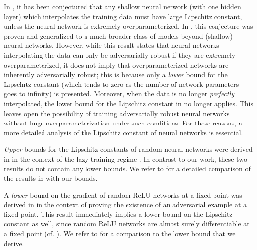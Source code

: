 In \cite{bubeck2021law}, it has been conjectured that any shallow neural network
(with one hidden layer)  which interpolates the training data must have large Lipschitz constant,
unless the neural network is extremely overparameterized.
In \cite{bubeck2021universal}, this conjecture was proven and generalized to a much broader class
of models beyond (shallow) neural networks. 
However, while this result states that neural networks interpolating the data
can only be adversarially robust if they are extremely overparameterized,
it does not imply that overparameterized networks are inherently adversarially robust;
this is because only a \emph{lower} bound for the Lipschitz constant (which tends to zero as the number of network parameters goes to infinity) is presented.
Moreover, when the data is no longer \emph{perfectly} interpolated,
the lower bound for the Lipschitz constant in \cite{bubeck2021universal} no longer applies.
This leaves open the possibility of training adversarially robust neural networks
without huge overparameterization under such conditions.
For these reasons, a more detailed analysis of the Lipschitz constant of neural networks is essential.

\emph{Upper} bounds for the Lipschitz constants of random neural networks were derived in \cite{nguyen2021tight,buchanan2021deep}
in the context of the lazy training regime \cite{chizat2019lazy}. 
In contrast to our work, these two results do not contain any lower bounds. 
We refer to  for a detailed comparison of the results in \cite{nguyen2021tight,buchanan2021deep} with our bounds.

A \emph{lower} bound on the gradient of random ReLU networks at a fixed point was derived in \cite{bartlett2021adversarial}
in the context of proving the existence of an adversarial example at a fixed point. This result immediately implies a lower bound on the Lipschitz constant as well,
since random ReLU networks are almost surely differentiable at a fixed point (cf. ).
We refer to  for a comparison to the lower bound that we derive.

